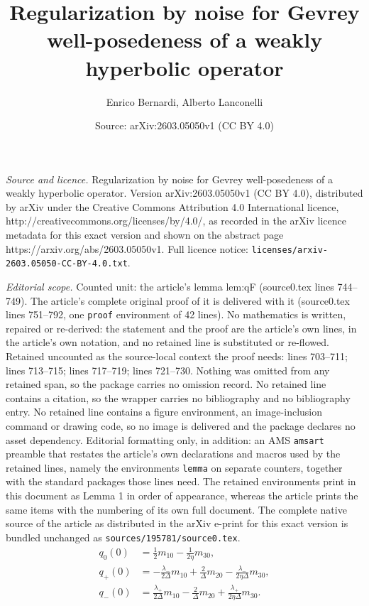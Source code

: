 \documentclass[10pt,a4paper]{amsart}
\title{Regularization by noise for Gevrey well-posedeness of a weakly hyperbolic operator}
\author{Enrico Bernardi, Alberto Lanconelli}
\date{Source: arXiv:2603.05050v1 (CC BY 4.0)}
\begin{document}
\maketitle

\noindent\emph{Source and licence.} Regularization by noise for Gevrey well-posedeness of a weakly hyperbolic operator. Version arXiv:2603.05050v1 (CC BY 4.0), distributed by arXiv under the Creative Commons Attribution 4.0 International licence, http://creativecommons.org/licenses/by/4.0/, as recorded in the arXiv licence metadata for this exact version and shown on the abstract page https://arxiv.org/abs/2603.05050v1. Full licence notice: \texttt{licenses/arxiv-2603.05050-CC-BY-4.0.txt}.\par\smallskip

\noindent\textit{Editorial scope.} Counted unit: the article's lemma lem:qF (source0.tex lines 744--749). The article's complete original proof of it is delivered with it (source0.tex lines 751--792, one \texttt{proof} environment of 42 lines). No mathematics is written, repaired or re-derived: the statement and the proof are the article's own lines, in the article's own notation, and no retained line is substituted or re-flowed.  Retained uncounted as the source-local context the proof needs: lines 703--711; lines 713--715; lines 717--719; lines 721--730.  Nothing was omitted from any retained span, so the package carries no omission record.  No retained line contains a citation, so the wrapper carries no bibliography and no bibliography entry.  No retained line contains a figure environment, an image-inclusion command or drawing code, so no image is delivered and the package declares no asset dependency.  Editorial formatting only, in addition: an AMS \texttt{amsart} preamble that restates the article's own declarations and macros used by the retained lines, namely the environments \texttt{lemma} on separate counters, together with the standard packages those lines need.  The retained environments print in this document as Lemma 1 in order of appearance, whereas the article prints the same items with the numbering of its own full document.  The complete native source of the article as distributed in the arXiv e-print for this exact version is bundled unchanged as \texttt{sources/195781/source0.tex}.
\begin{align}
q_0(0) &= \frac12 m_{10}-\frac{1}{2\eta}m_{30}, \label{eq:q0}\\
q_+(0) &= -\frac{\lambda_-}{2\Delta}m_{10}
         +\frac{2}{\Delta}m_{20}
         -\frac{\lambda_-}{2\eta\Delta}m_{30},\label{eq:qp}\\
q_-(0) &= \frac{\lambda_+}{2\Delta}m_{10}
         -\frac{2}{\Delta}m_{20}
         +\frac{\lambda_+}{2\eta\Delta}m_{30}. \label{eq:qm}
\end{align}
\end{document}
